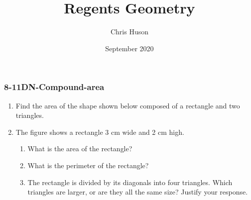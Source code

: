 \documentclass[12pt, twoside]{article}
\title{Regents Geometry}
\author{Chris Huson}
\date{September 2020}
\begin{document}
\subsubsection*{8-11DN-Compound-area}
\begin{enumerate}
\item Find the area of the shape shown below composed of a rectangle and two triangles.
    \begin{flushright}
  \end{flushright} \vspace{1cm}
  
\item The figure shows a rectangle 3 cm wide and 2 cm high.
  \begin{center}
  \end{center}
    \begin{enumerate}
      \item What is the area of the rectangle? \vspace{2.5cm}
      \item What is the perimeter of the rectangle? \vspace{2.5cm}
      \item The rectangle is divided by its diagonals into four triangles. Which triangles are larger, or are they all the same size? Justify your response. \vspace{2cm}
    \end{enumerate}


\end{enumerate}
\end{document}
